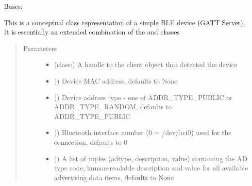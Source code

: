 \documentclass[letterpaper,10pt,english]{sphinxmanual}
\begin{document}
\begin{fulllineitems}
\label{\detokenize{simpleble:simpleble.SimpleBleDevice}}
Bases: 

This is a conceptual class representation of a simple BLE device (GATT Server). It is essentially an extended combination of the  and  classes
\begin{quote}\begin{description}
\item[{Parameters}] \leavevmode\begin{itemize}
\item {} 
 (class:) \textendash{} A handle to the {\hyperref[\detokenize{simpleble:simpleble.SimpleBleClient}]{}} client object that detected the device

\item {} 
 (\sphinxstyleliteralemphasis{\sphinxupquote{, }}) \textendash{} Device MAC address, defaults to None

\item {} 
 (\sphinxstyleliteralemphasis{\sphinxupquote{, }}) \textendash{} Device address type - one of ADDR\_TYPE\_PUBLIC or ADDR\_TYPE\_RANDOM, defaults to ADDR\_TYPE\_PUBLIC

\item {} 
 (\sphinxstyleliteralemphasis{\sphinxupquote{, }}) \textendash{} Bluetooth interface number (0 = /dev/hci0) used for the connection, defaults to 0

\item {} 
 (\sphinxstyleliteralemphasis{\sphinxupquote{, }}) \textendash{} A list of tuples (adtype, description, value) containing the AD type code, human-readable description and value for all available advertising data items, defaults to None


\end{itemize}
\end{description}
\end{quote}
\end{fulllineitems}
\end{document}
